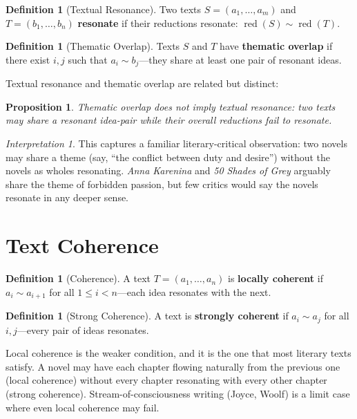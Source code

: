 \documentclass[11pt,openany]{book}
\theoremstyle{definition}
\newtheorem{definition}[axiom]{Definition}
\theoremstyle{plain}
\newtheorem{proposition}[axiom]{Proposition}
\theoremstyle{remark}
\newtheorem{interpretation}[axiom]{Interpretation}
\newcommand{\res}{\sim}                      %
\begin{document}
\begin{definition}[Textual Resonance]
Two texts $S = (a_1, \ldots, a_m)$ and $T = (b_1, \ldots, b_n)$ \textbf{resonate} if their reductions resonate: $\operatorname{red}(S) \res \operatorname{red}(T)$.
\end{definition}

\begin{definition}[Thematic Overlap]
Texts $S$ and $T$ have \textbf{thematic overlap} if there exist $i, j$ such that $a_i \res b_j$---they share at least one pair of resonant ideas.
\end{definition}

Textual resonance and thematic overlap are related but distinct:

\begin{proposition}
Thematic overlap does not imply textual resonance: two texts may share a resonant idea-pair while their overall reductions fail to resonate.
\end{proposition}

\begin{interpretation}
This captures a familiar literary-critical observation: two novels may share a theme (say, ``the conflict between duty and desire'') without the novels as wholes resonating. \emph{Anna Karenina} and \emph{50 Shades of Grey} arguably share the theme of forbidden passion, but few critics would say the novels resonate in any deeper sense.
\end{interpretation}

\section{Text Coherence}

\begin{definition}[Coherence]
A text $T = (a_1, \ldots, a_n)$ is \textbf{locally coherent} if $a_i \res a_{i+1}$ for all $1 \leq i < n$---each idea resonates with the next.
\end{definition}

\begin{definition}[Strong Coherence]
A text is \textbf{strongly coherent} if $a_i \res a_j$ for all $i, j$---every pair of ideas resonates.
\end{definition}

Local coherence is the weaker condition, and it is the one that most literary texts satisfy. A novel may have each chapter flowing naturally from the previous one (local coherence) without every chapter resonating with every other chapter (strong coherence). Stream-of-consciousness writing (Joyce, Woolf) is a limit case where even local coherence may fail.
\end{document}

